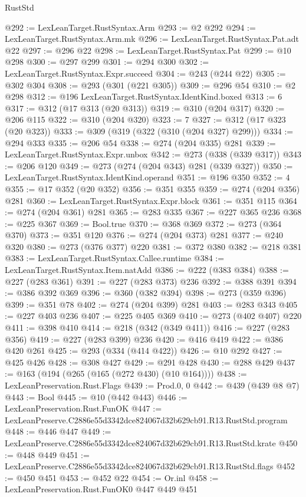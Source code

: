 \begin{lexlean}{RustStd}
\begin{coremodule}
@292 := LexLeanTarget.RustSyntax.Arm
@293 := @2 @292
@294 := LexLeanTarget.RustSyntax.Arm.mk
@296 := LexLeanTarget.RustSyntax.Pat.adt @22
@297 := @296 @22
@298 := LexLeanTarget.RustSyntax.Pat
@299 := @10 @298
@300 := @297 @299
@301 := @294 @300
@302 := LexLeanTarget.RustSyntax.Expr.succeed
@304 := @243 (@244 @22)
@305 := @302 @304
@308 := @293 (@301 (@221 @305))
@309 := @296 @54
@310 := @2 @298
@312 := @196 LexLeanTarget.RustSyntax.IdentKind.boxed
@313 := 6
@317 := @312 (@17 @313 (@20 @313))
@319 := @310 (@204 @317)
@320 := @206 @115
@322 := @310 (@204 @320)
@323 := 7
@327 := @312 (@17 @323 (@20 @323))
@333 := @309 (@319 (@322 (@310 (@204 @327) @299)))
@334 := @294 @333
@335 := @206 @54
@338 := @274 (@204 @335) @281
@339 := LexLeanTarget.RustSyntax.Expr.unbox
@342 := @273 (@338 (@339 @317))
@343 := @206 @120
@349 := @273 (@274 (@204 @343) @281 (@339 @327))
@350 := LexLeanTarget.RustSyntax.IdentKind.operand
@351 := @196 @350
@352 := 4
@355 := @17 @352 (@20 @352)
@356 := @351 @355
@359 := @274 (@204 @356) @281
@360 := LexLeanTarget.RustSyntax.Expr.block
@361 := @351 @115
@364 := @274 (@204 @361) @281
@365 := @283 @335
@367 := @227 @365 @236
@368 := @225 @367
@369 := Bool.true
@370 := @368 @369
@372 := @273 (@364 @370)
@373 := @351 @120
@376 := @274 (@204 @373) @281
@377 := @240 @320
@380 := @273 (@376 @377) @220
@381 := @372 @380
@382 := @218 @381
@383 := LexLeanTarget.RustSyntax.Callee.runtime
@384 := LexLeanTarget.RustSyntax.Item.natAdd
@386 := @222 (@383 @384)
@388 := @227 (@283 @361)
@391 := @227 (@283 @373) @236
@392 := @388 @391
@394 := @386 @392 @369
@396 := @360 (@382 @394)
@398 := @273 (@359 @396)
@399 := @351 @78
@402 := @274 (@204 @399) @281
@403 := @283 @343
@405 := @227 @403 @236
@407 := @225 @405 @369
@410 := @273 (@402 @407) @220
@411 := @398 @410
@414 := @218 (@342 (@349 @411))
@416 := @227 (@283 @356)
@419 := @227 (@283 @399) @236
@420 := @416 @419
@422 := @386 @420 @261
@425 := @293 (@334 (@414 @422))
@426 := @10 @292
@427 := @425 @426
@428 := @308 @427
@429 := @291 @428
@430 := @288 @429
@437 := @163 (@194 (@265 (@165 (@272 @430) (@10 @164))))
@438 := LexLeanPreservation.Rust.Flags
@439 := Prod.{0, 0}
@442 := @439 (@439 @8 @7)
@443 := Bool
@445 := @10 (@442 @443)
@446 := LexLeanPreservation.Rust.FunOK
@447 := LexLeanPreserve.C2886e55d3342dce824067d32b629cb91.R13.RustStd.program
@448 := @446 @447
@449 := LexLeanPreserve.C2886e55d3342dce824067d32b629cb91.R13.RustStd.krate
@450 := @448 @449
@451 := LexLeanPreserve.C2886e55d3342dce824067d32b629cb91.R13.RustStd.flags
@452 := @450 @451
@453 := @452 @22
@454 := Or.inl
@458 := LexLeanPreservation.Rust.FunOK0 @447 @449 @451

\end{coremodule}
\end{lexlean}

